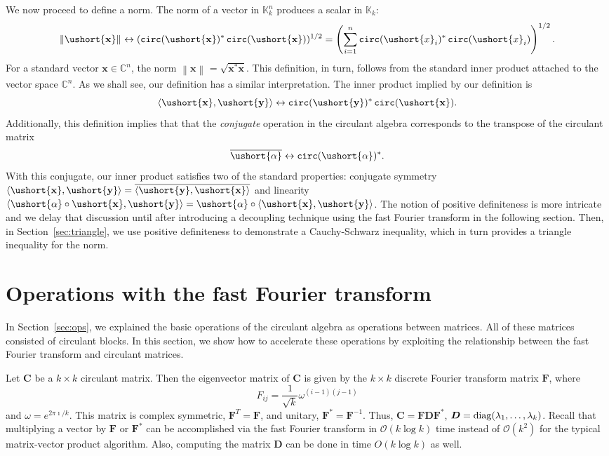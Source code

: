 \documentclass[1p,authoryear,letterpaper]{elsarticle}
\DeclareMathOperator{\tcirc}{\texttt{circ}}
\providecommand{\ii}{\imath}
\providecommand{\KK}{\mathbb{K}}
\providecommand{\CC}{\mathbb{C}}
\providecommand{\normof}[2][]{\left\| #2 \right\|_{#1}}\providecommand{\nnormof}[2][]{\| #2 \|_{#1}}\providecommand{\itr}[2]{#1^{(#2)}}
\newcommand{\niprod}[2]{\langle {#1}, {#2} \rangle}
\newcommand{\iprod}{\niprod}
\providecommand{\mat}{\boldsymbol}
\renewcommand{\vec}{\mathbf}
\providecommand{\mC}{\ensuremath{\mat{C}}}
\providecommand{\mD}{\ensuremath{\mat{D}}}
\providecommand{\mF}{\ensuremath{\mat{F}}}
\providecommand{\vx}{\ensuremath{\vec{x}}}
\renewcommand{\circeq}{\leftrightarrow}
\newcommand{\cel}[1]{\ushort{#1}}
\newcommand{\celv}[1]{\cel{\vec{#1}}}
\newcommand{\calpha}{\ensuremath{\cel{\alpha}}}
\newcommand{\cx}{\ensuremath{\cel{x}}}
\newcommand{\cvx}{\ensuremath{\celv{x}}}
\newcommand{\cvy}{\ensuremath{\celv{y}}}
\begin{document}
We now proceed  to define a norm.  The norm of
a vector in $\KK_k^n$ produces a scalar in $\KK_k$:
\[ \normof{\cvx} \circeq (\tcirc(\cvx)^* \tcirc(\cvx))^{1/2} =
    \left( \sum_{i=1}^n \tcirc(\cx_i)^* \tcirc(\cx_i) \right)^{1/2}. \]
For a standard vector $\vx \in \CC^{n}$, the norm
$\normof{\vx} = \sqrt{\vx^* \vx}$.  This definition, in turn,
follows from the standard inner product attached
to the vector space $\CC^{n}$.  As we shall see, our definition
has a similar interpretation.  The inner product implied by our
definition is
\[ \iprod{\cvx}{\cvy} \circeq \tcirc(\cvy)^* \tcirc(\cvx). \]
Additionally, this definition implies that that the \emph{conjugate}
operation in the circulant algebra corresponds to the transpose
of the circulant matrix
\[ \overline{\calpha} \circeq \tcirc(\calpha)^*. \]
With this conjugate, our inner product
satisfies two of the standard properties: conjugate symmetry
$\iprod{\cvx}{\cvy} = \overline{\iprod{\cvy}{\cvx}}$ and
linearity $\iprod{\calpha \circ \cvx}{\cvy} = \calpha \circ \iprod{\cvx}{\cvy}$.
The notion of positive definiteness is more intricate and we
delay that discussion until after introducing
a decoupling technique using the fast Fourier transform
in the following section.   Then, in Section~\ref{sec:triangle},
we use positive definiteness to
demonstrate a Cauchy-Schwarz inequality, which in turn
provides a triangle inequality for the norm.




\section{Operations with the fast Fourier transform}
\label{sec:fft}
In Section~\ref{sec:ops}, we explained the basic operations
of the circulant algebra as operations between matrices.
All of these matrices consisted of circulant blocks.
In this section, we show how to accelerate these operations
by exploiting the relationship between the fast Fourier transform and circulant matrices.

Let $\mC$ be a $k \times k$ circulant
matrix. Then the
eigenvector matrix of $\mC$ is given by the $k \times k$
discrete Fourier transform matrix $\mF$, where
\[ F_{ij} = \frac{1}{\sqrt{k}} \omega^{(i-1)(j-1)} \]
and $\omega = e^{2\pi \ii/k}$.
This matrix is complex symmetric, $\mF^T = \mF$, and
unitary, $\mF^* = \mF^{-1}$.  Thus, $\mC = \mF \mD \mF^*$,
$\mD = \diag(\lambda_1, \ldots, \lambda_k)$.
Recall that multiplying a vector by $\mF$ or $\mF^*$ can be
accomplished via the fast Fourier transform in
$\mathcal{O}(k \log k)$ time instead of $\mathcal{O}(k^2)$
for the typical matrix-vector product algorithm.  Also,
computing the matrix $\mD$ can be done in time $O(k \log k)$
as well.
\end{document}
